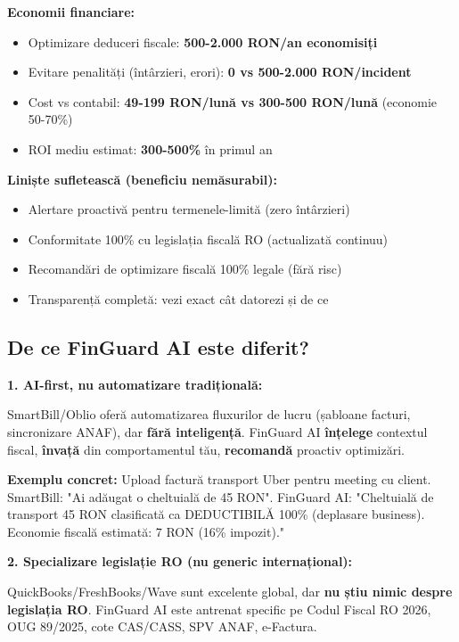 \documentclass[11pt,a4paper]{article}
\begin{document}
\textbf{Economii financiare:}
\begin{itemize}[nosep]
    \item Optimizare deduceri fiscale: \textbf{500-2.000 RON/an economisiți}
    \item Evitare penalități (întârzieri, erori): \textbf{0 vs 500-2.000 RON/incident}
    \item Cost vs contabil: \textbf{49-199 RON/lună vs 300-500 RON/lună} (economie 50-70\%)
    \item ROI mediu estimat: \textbf{300-500\%} în primul an
\end{itemize}

\textbf{Liniște sufletească (beneficiu nemăsurabil):}
\begin{itemize}[nosep]
    \item Alertare proactivă pentru termenele-limită (zero întârzieri)
    \item Conformitate 100\% cu legislația fiscală RO (actualizată continuu)
    \item Recomandări de optimizare fiscală 100\% legale (fără risc)
    \item Transparență completă: vezi exact cât datorezi și de ce
\end{itemize}

\subsection{De ce FinGuard AI este diferit?}

\textbf{1. AI-first, nu automatizare tradițională:}

SmartBill/Oblio oferă automatizarea fluxurilor de lucru (șabloane facturi, sincronizare ANAF), dar \textbf{fără inteligență}. FinGuard AI \textbf{înțelege} contextul fiscal, \textbf{învață} din comportamentul tău, \textbf{recomandă} proactiv optimizări.

\textbf{Exemplu concret:} Upload factură transport Uber pentru meeting cu client. SmartBill: "Ai adăugat o cheltuială de 45 RON". FinGuard AI: "Cheltuială de transport 45 RON clasificată ca DEDUCTIBILĂ 100\% (deplasare business). Economie fiscală estimată: 7 RON (16\% impozit)."

\textbf{2. Specializare legislație RO (nu generic internațional):}

QuickBooks/FreshBooks/Wave sunt excelente global, dar \textbf{nu știu nimic despre legislația RO}. FinGuard AI este antrenat specific pe Codul Fiscal RO 2026, OUG 89/2025, cote CAS/CASS, SPV ANAF, e-Factura.
\end{document}
